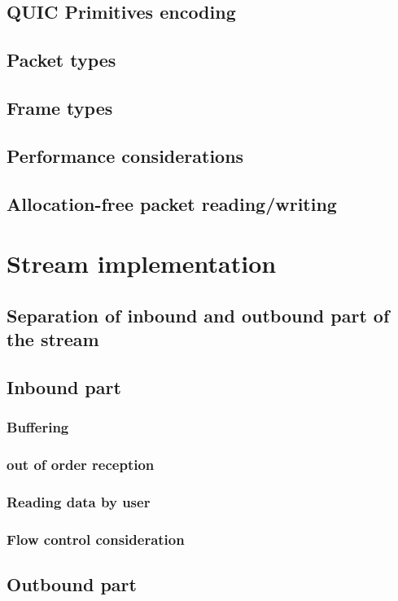 \subsection{QUIC Primitives encoding}
\subsection{Packet types}
\subsection{Frame types}
\subsection{Performance considerations}
\subsection{Allocation-free packet reading/writing}


\section{Stream implementation}

\subsection{Separation of inbound and outbound part of the stream}
\subsection{Inbound part}


\subsubsection{Buffering}
\subsubsection{out of order reception}
\subsubsection{Reading data by user}
\subsubsection{Flow control consideration}


\subsection{Outbound part}

